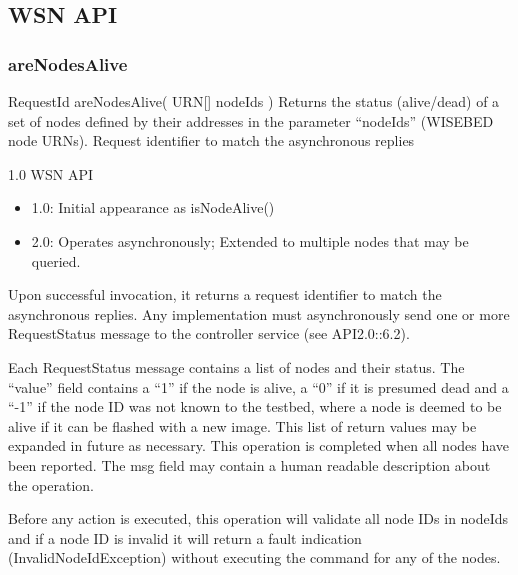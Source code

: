 		\subsection{WSN API}

			\subsubsection{areNodesAlive}

\begin{apidoc}
	{RequestId areNodesAlive( URN[] nodeIds )} %
	{Returns the status (alive/dead) of a set of nodes defined by their addresses in the parameter ``nodeIds'' (WISEBED node URNs).  	
	} %
	{
	} %
	{Request identifier to match the asynchronous replies} %
	{ } %
	{1.0 WSN API
		\begin{itemize}
			\item 1.0: Initial appearance as isNodeAlive()
			\item 2.0: Operates asynchronously; Extended to multiple nodes that may be queried.
		\end{itemize}
	} %
\end{apidoc}

Upon successful invocation, it returns a request identifier to match the asynchronous replies. Any implementation must asynchronously send one or more RequestStatus message to the controller service (see API2.0::6.2).

Each RequestStatus message contains a list of nodes and their status. The ``value'' field contains a ``1'' if the node is alive, a ``0'' if it is presumed dead and a ``-1'' if the node ID was not known to the testbed, where a node is deemed to be alive if it can be flashed with a new image. This list of return values may be expanded in future as necessary. This operation is completed when all nodes have been reported. The msg field may contain a human readable description about the operation. 

Before any action is executed, this operation will validate all node IDs in nodeIds and if a node ID is invalid it will return a fault indication (InvalidNodeIdException) without executing the command for any of the nodes.

